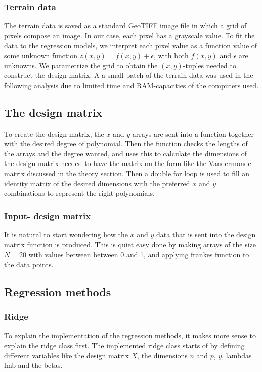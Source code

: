 \documentclass[../main.tex]{subfiles}
\begin{document}
\subsubsection{Terrain data}
The terrain data is saved as a standard GeoTIFF image file in which a grid of pixels compose an image. In our case, each pixel has a grayscale value. To fit the data to the regression models, we interpret each pixel value as a function value of some unknown function \ensuremath{z(x,y)=f(x,y)+\epsilon}, with both \ensuremath{f(x,y)} and $\epsilon$ are unknowns. We parametrize the grid to obtain the \ensuremath{(x,y)}-tuples needed to construct the design matrix. A a small patch of the terrain data was used in the following analysis due to limited time and RAM-capacities of the computers used.

\subsection{The design matrix}
To create the design matrix, the $x$ and $y$ arrays are sent into a function together with the desired degree of polynomial. Then the function checks the lengths of the arrays and the degree wanted, and uses this to calculate the dimensions of the design matrix needed to have the matrix on the form like the Vandermonde matrix discussed in the theory section. Then a double for loop is used to fill an identity matrix of the desired dimensions with the preferred $x$ and $y$ combinations to represent the right polynomials.

\subsubsection{Input- design matrix}
It is natural to start wondering how the $x$ and $y$ data that is sent into the design matrix function is produced. This is quiet easy done by making arrays of the size $N=20$ with values between between 0 and 1, and applying frankes function to the data points.

\subsection{Regression methods}
\subsubsection{Ridge}
To explain the implementation of the regression methods, it makes more sense to explain the ridge class first. The implemented ridge class starts of by defining different variables like the design matrix $X$, the dimensions $n$ and $p$, $y$, lambdas lmb and the betas.
\end{document}
